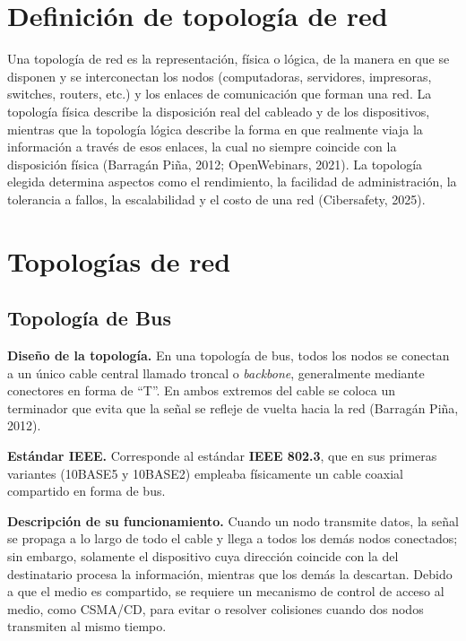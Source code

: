 \documentclass[12pt,letterpaper]{article}
\begin{document}
\section{Definición de topología de red}

Una topología de red es la representación, física o lógica, de la manera en que se disponen y se interconectan los nodos (computadoras, servidores, impresoras, switches, routers, etc.) y los enlaces de comunicación que forman una red. La topología física describe la disposición real del cableado y de los dispositivos, mientras que la topología lógica describe la forma en que realmente viaja la información a través de esos enlaces, la cual no siempre coincide con la disposición física (Barragán Piña, 2012; OpenWebinars, 2021). La topología elegida determina aspectos como el rendimiento, la facilidad de administración, la tolerancia a fallos, la escalabilidad y el costo de una red (Cibersafety, 2025).

\section{Topologías de red}

\subsection{Topología de Bus}

\textbf{Diseño de la topología.} En una topología de bus, todos los nodos se conectan a un único cable central llamado troncal o \textit{backbone}, generalmente mediante conectores en forma de ``T''. En ambos extremos del cable se coloca un terminador que evita que la señal se refleje de vuelta hacia la red (Barragán Piña, 2012).

\textbf{Estándar IEEE.} Corresponde al estándar \textbf{IEEE 802.3}, que en sus primeras variantes (10BASE5 y 10BASE2) empleaba físicamente un cable coaxial compartido en forma de bus.

\textbf{Descripción de su funcionamiento.} Cuando un nodo transmite datos, la señal se propaga a lo largo de todo el cable y llega a todos los demás nodos conectados; sin embargo, solamente el dispositivo cuya dirección coincide con la del destinatario procesa la información, mientras que los demás la descartan. Debido a que el medio es compartido, se requiere un mecanismo de control de acceso al medio, como CSMA/CD, para evitar o resolver colisiones cuando dos nodos transmiten al mismo tiempo.
\end{document}

